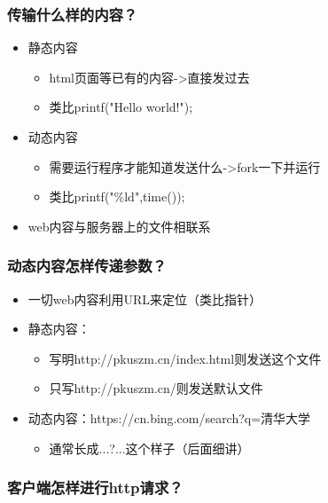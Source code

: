 \documentclass[AutoFakeBold]{beamer}
\begin{document}
{\begin{frame}
    \end{frame}

    \begin{frame}
        \frametitle{传输什么样的内容？}
    
        \begin{itemize}
            \item 静态内容\begin{itemize}
                \item html页面等已有的内容->直接发过去
                \item 类比printf("Hello world!");
            \end{itemize}
            \item 动态内容\begin{itemize}
                \item 需要运行程序才能知道发送什么->fork一下并运行
                \item 类比printf("\%ld",time());
            \end{itemize}
            \item web内容与服务器上的文件相联系
        \end{itemize}
    
    \end{frame}

    \begin{frame}
        \frametitle{动态内容怎样传递参数？}
    
        \begin{itemize}
            \item 一切web内容利用URL来定位（类比指针）
            \item 静态内容：\begin{itemize}
                \item 写明http://pkuszm.cn/index.html则发送这个文件
                \item 只写http://pkuszm.cn/则发送默认文件
            \end{itemize}
            \item 动态内容：https://cn.bing.com/search?q=清华大学\begin{itemize}
                \item 通常长成...?...这个样子（后面细讲）
            \end{itemize}
        \end{itemize}
    
    \end{frame}

    \begin{frame}[fragile]
        \frametitle{客户端怎样进行http请求？}
    

\end{frame}}
\end{document}
